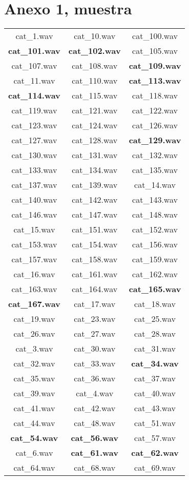 \documentclass[twocolumn,10pt]{asme2ej}
\begin{document}
\section{Anexo 1, muestra} %
\label{sec:anexo_1_muestra}
\begin{table}[h]
  \begin{tabular}{ccc}
cat\_1.wav & cat\_10.wav & cat\_100.wav\\
\textbf{cat\_101.wav} & \textbf{cat\_102.wav} & cat\_105.wav\\
cat\_107.wav & cat\_108.wav & \textbf{cat\_109.wav}\\
cat\_11.wav & cat\_110.wav & \textbf{cat\_113.wav}\\
\textbf{cat\_114.wav} & cat\_115.wav & cat\_118.wav\\
cat\_119.wav & cat\_121.wav & cat\_122.wav\\
cat\_123.wav & cat\_124.wav & cat\_126.wav\\
cat\_127.wav & cat\_128.wav & \textbf{cat\_129.wav}\\
cat\_130.wav & cat\_131.wav & cat\_132.wav\\
cat\_133.wav & cat\_134.wav & cat\_135.wav\\
cat\_137.wav & cat\_139.wav & cat\_14.wav\\
cat\_140.wav & cat\_142.wav & cat\_143.wav\\
cat\_146.wav & cat\_147.wav & cat\_148.wav\\
cat\_15.wav & cat\_151.wav & cat\_152.wav\\
cat\_153.wav & cat\_154.wav & cat\_156.wav\\
cat\_157.wav & cat\_158.wav & cat\_159.wav\\
cat\_16.wav & cat\_161.wav & cat\_162.wav\\
cat\_163.wav & cat\_164.wav & \textbf{cat\_165.wav}\\
\textbf{cat\_167.wav} & cat\_17.wav & cat\_18.wav\\
cat\_19.wav & cat\_23.wav & cat\_25.wav\\
cat\_26.wav & cat\_27.wav & cat\_28.wav\\
cat\_3.wav & cat\_30.wav & cat\_31.wav\\
cat\_32.wav & cat\_33.wav & \textbf{cat\_34.wav}\\
cat\_35.wav & cat\_36.wav & cat\_37.wav\\
cat\_39.wav & cat\_4.wav & cat\_40.wav\\
cat\_41.wav & cat\_42.wav & cat\_43.wav\\
cat\_44.wav & cat\_48.wav & cat\_51.wav\\
\textbf{cat\_54.wav} & \textbf{cat\_56.wav} & cat\_57.wav\\
cat\_6.wav & \textbf{cat\_61.wav} & \textbf{cat\_62.wav}\\
cat\_64.wav & cat\_68.wav & cat\_69.wav\\
\end{tabular}
\end{table}
\end{document}

